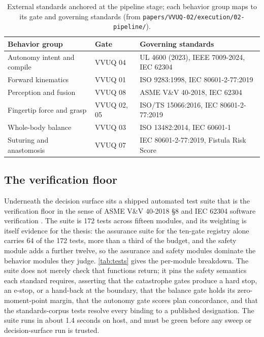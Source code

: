 \begin{table}[H]
\caption{External standards anchored at the pipeline stage; each behavior group
maps to its gate and governing standards (from
\texttt{papers/VVUQ-02/execution/02-pipeline/}).}
\label{tab:anchoring}
\centering
\footnotesize
\begin{tabularx}{\textwidth}{L{5cm} L{2.7cm} Y}
\toprule
\textbf{Behavior group} & \textbf{Gate} & \textbf{Governing standards} \\
\midrule
Autonomy intent and compile & VVUQ 04 & UL 4600 (2023), IEEE 7009-2024, IEC 62304 \\
Forward kinematics & VVUQ 01 & ISO 9283:1998, IEC 80601-2-77:2019 \\
Perception and fusion & VVUQ 08 & ASME V\&V 40-2018, IEC 62304 \\
Fingertip force and grasp & VVUQ 02, 05 & ISO/TS 15066:2016, IEC 80601-2-77:2019 \\
Whole-body balance & VVUQ 03 & ISO 13482:2014, IEC 60601-1 \\
Suturing and anastomosis & VVUQ 07 & IEC 80601-2-77:2019, Fistula Risk Score \\
\bottomrule
\end{tabularx}
\end{table}

\subsection{The verification floor}

Underneath the decision surface sits a shipped automated test suite that is the
verification floor in the sense of ASME V\&V 40-2018 \S8 and IEC 62304 software
verification \cite{iec62304}. The suite is 172 tests across fifteen modules, and
its weighting is itself evidence for the thesis: the assurance suite for the
ten-gate registry alone carries 64 of the 172 tests, more than a third of the
budget, and the safety module adds a further twelve, so the assurance and safety
modules dominate the behavior modules they judge. \autoref{tab:tests} gives the
per-module breakdown. The suite does not merely check that functions return; it
pins the safety semantics each standard requires, asserting that the catastrophe
gates produce a hard stop, an e-stop, or a hand-back at the boundary, that the
balance gate holds its zero-moment-point margin, that the autonomy gate scores
plan concordance, and that the standards-corpus tests resolve every binding to a
published designation. The suite runs in about 1.4 seconds on host, and
must be green before any sweep or decision-surface run is trusted.

